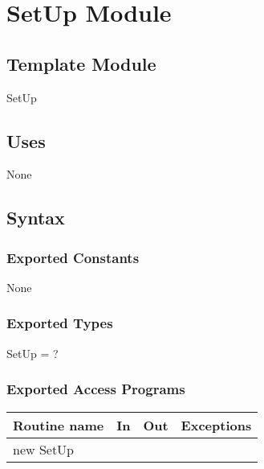 \documentclass[12pt]{article}
\newcommand{\authornote}[3]{\textcolor{#1}{[#3 ---#2]}}
\newcommand{\authornote}[3]{}
\newcommand{\wss}[1]{\authornote{blue}{SS}{#1}}
\begin{document}


% 
% 

\newpage

\section* {SetUp Module}

\subsection*{Template Module}

SetUp

\subsection* {Uses}

None

\subsection* {Syntax}

\subsubsection* {Exported Constants}

None

\subsubsection* {Exported Types}

SetUp = ?

\subsubsection* {Exported Access Programs}

\begin{tabular}{| l | l | l | p{5cm} |}
\hline
\textbf{Routine name} & \textbf{In} & \textbf{Out} & \textbf{Exceptions}\\
\hline
new SetUp & & & \\
\hline
\end{tabular}
\end{document}
